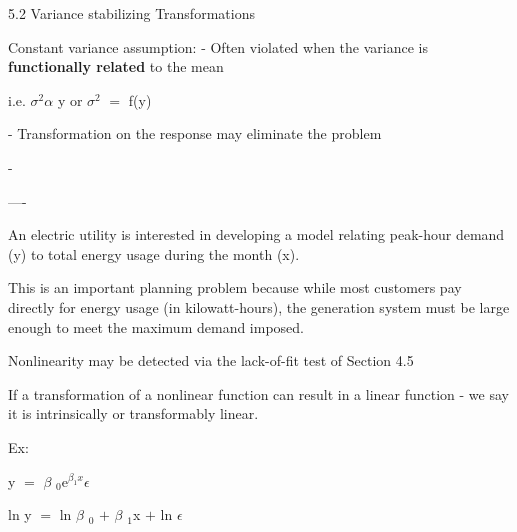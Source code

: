 \documentclass{article}
\newcommand{\mt}[1]{\ensuremath{#1}}
\newcommand{\ep}{\mt{\epsilon} }         %
\newcommand{\afa}{\mt{\alpha} }
\newcommand{\bta}{\mt{\beta} }
\newcommand{\ps}{\mt{\operatorname{+}} }
\newcommand{\eql}{ \mt{\operatorname{=}} }
\newcommand{\uw}[2]{#1\mt{_{#2}}}
\newcommand{\uf}[2]{#1\mt{^{#2}}}
\newcommand{\txt}[1]{\text{#1}} %
\newcommand{\ssq}{\mt{\sigma^2}}
\newcommand{\exv}[1]{\txt{E[}#1\txt{]}}
\begin{document}
5.2 Variance stabilizing Transformations

Constant variance assumption:
- Often violated when the variance is \textbf{functionally related} to the mean

i.e. \ssq \afa \exv{y} or \ssq \eql f(\exv{y})

- Transformation on the response may eliminate the problem

- 

----

An electric utility is interested in developing a model relating peak-hour demand (y) to total energy usage during the month (x).

This is an important planning problem because while most customers pay directly for energy usage (in kilowatt-hours), the generation system must be large enough to meet the maximum demand imposed.


Nonlinearity may be detected via the lack-of-fit test of Section 4.5

If a transformation of a nonlinear function can result in a linear function - we say it is intrinsically or transformably linear.

Ex:

y \eql \uw{\bta}{0}\uf{e}{\bta_1x}\ep 

ln y \eql ln \uw{\bta}{0} \ps \uw{\bta}{1}x \ps ln \ep
\end{document}
